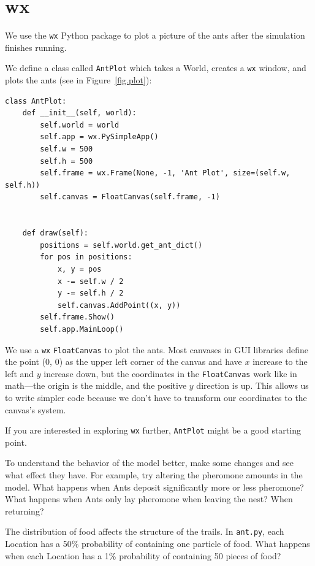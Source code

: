 \documentclass[10pt]{book}
\begin{document}
\section{wx}

We use the \texttt{wx} Python package to plot a picture of the ants
after the simulation finishes running.

We define a class called \texttt{AntPlot} which
takes a World, creates a \texttt{wx} window, and plots
the ants (see in Figure~\ref{fig.plot}):

\begin{verbatim}
class AntPlot:
    def __init__(self, world):
        self.world = world
        self.app = wx.PySimpleApp()
        self.w = 500
        self.h = 500
        self.frame = wx.Frame(None, -1, 'Ant Plot', size=(self.w, self.h))
        self.canvas = FloatCanvas(self.frame, -1)
        
    
    def draw(self):
        positions = self.world.get_ant_dict()
        for pos in positions:
            x, y = pos
            x -= self.w / 2
            y -= self.h / 2
            self.canvas.AddPoint((x, y))
        self.frame.Show()
        self.app.MainLoop()
\end{verbatim}

We use a {\tt wx} \texttt{FloatCanvas} to plot the ants.  Most
canvases in GUI libraries define the point (0, 0) as the upper left
corner of the canvas and have $x$ increase to the left and $y$ increase
down, but the coordinates in the \texttt{FloatCanvas} work like in
math---the origin is the middle, and the positive $y$ direction is up. This
allows us to write simpler code because we don't have to transform our
coordinates to the canvas's system.

If you are interested in exploring \texttt{wx}
further, \texttt{AntPlot} might be a good starting point.


\begin{exercise}

To understand the behavior of the model better, make some changes
and see what effect they have.  For example, try altering the
pheromone amounts in the model.
What
happens when Ants deposit significantly more or less pheromone?
What happens when
Ants only lay pheromone when leaving the nest? When returning? 
\end{exercise}

\begin{exercise}

The distribution of food affects the structure of the trails.
In \texttt{ant.py}, each Location has a 50\% probability of
containing one particle of food.  What happens when each Location has
a 1\% probability of containing 50 pieces of food?
\end{exercise}
\end{document}
